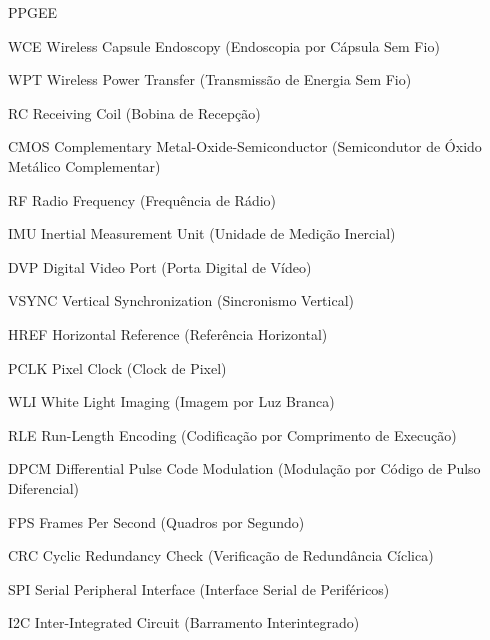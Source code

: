 \documentclass[repeatfields,xlists,xpacks,oneside]{ufrgscca}
\begin{document}
\begin{listofabbrv}{PPGEE}
	\item[WCE] Wireless Capsule Endoscopy (Endoscopia por Cápsula Sem Fio)
	\item[WPT] Wireless Power Transfer (Transmissão de Energia Sem Fio)
	\item[RC] Receiving Coil (Bobina de Recepção)
	\item[CMOS] Complementary Metal-Oxide-Semiconductor (Semicondutor de Óxido Metálico Complementar)
	\item[RF] Radio Frequency (Frequência de Rádio)
	\item[IMU] Inertial Measurement Unit (Unidade de Medição Inercial)
           \item[DVP] Digital Video Port (Porta Digital de Vídeo)
	\item[VSYNC] Vertical Synchronization (Sincronismo Vertical)
	\item[HREF] Horizontal Reference (Referência Horizontal)
	\item[PCLK] Pixel Clock (Clock de Pixel)
	\item[WLI] White Light Imaging (Imagem por Luz Branca)
	\item[RLE] Run-Length Encoding (Codificação por Comprimento de Execução)
	\item[DPCM] Differential Pulse Code Modulation (Modulação por Código de Pulso Diferencial)
	\item[FPS] Frames Per Second (Quadros por Segundo)
	\item[CRC] Cyclic Redundancy Check (Verificação de Redundância Cíclica)
	\item[SPI] Serial Peripheral Interface (Interface Serial de Periféricos)
	\item[I2C] Inter-Integrated Circuit (Barramento Interintegrado)

\end{listofabbrv}



\tableofcontents


\end{document}
